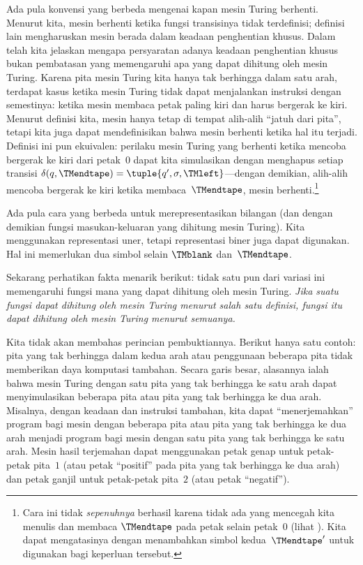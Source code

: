 \documentclass[../../../include/open-logic-section]{subfiles}
\begin{document}
Ada pula konvensi yang berbeda mengenai kapan mesin Turing berhenti. Menurut
kita, mesin berhenti ketika fungsi transisinya tidak terdefinisi; definisi lain
mengharuskan mesin berada dalam keadaan penghentian khusus. Dalam
 telah kita jelaskan mengapa persyaratan adanya keadaan
penghentian khusus bukan pembatasan yang memengaruhi apa yang dapat dihitung
oleh mesin Turing. Karena pita mesin Turing kita hanya tak berhingga dalam
satu arah, terdapat kasus ketika mesin Turing tidak dapat menjalankan
instruksi dengan semestinya: ketika mesin membaca petak paling kiri dan harus
bergerak ke kiri. Menurut definisi kita, mesin hanya tetap di tempat alih-alih
``jatuh dari pita'', tetapi kita juga dapat mendefinisikan bahwa mesin berhenti
ketika hal itu terjadi. Definisi ini pun ekuivalen: perilaku mesin Turing yang
berhenti ketika mencoba bergerak ke kiri dari petak~$0$ dapat kita simulasikan
dengan menghapus setiap transisi $\delta(q,\TMendtape) =
\tuple{q',\sigma,\TMleft}$---dengan demikian, alih-alih mencoba bergerak ke
kiri ketika membaca~$\TMendtape$, mesin berhenti.\footnote{Cara ini tidak
\emph{sepenuhnya} berhasil karena tidak ada yang mencegah kita menulis dan
membaca $\TMendtape$ pada petak selain petak~$0$ (lihat
). Kita dapat mengatasinya dengan menambahkan simbol
kedua~$\TMendtape'$ untuk digunakan bagi keperluan tersebut.}

Ada pula cara yang berbeda untuk merepresentasikan bilangan (dan dengan
demikian fungsi masukan-keluaran yang dihitung mesin Turing). Kita menggunakan
representasi uner, tetapi representasi biner juga dapat digunakan. Hal ini
memerlukan dua simbol selain $\TMblank$ dan~$\TMendtape$.

Sekarang perhatikan fakta menarik berikut: tidak satu pun dari variasi ini
memengaruhi fungsi mana yang dapat dihitung oleh mesin Turing. \emph{Jika suatu
fungsi dapat dihitung oleh mesin Turing menurut salah satu definisi, fungsi itu
dapat dihitung oleh mesin Turing menurut semuanya.}

Kita tidak akan membahas perincian pembuktiannya. Berikut hanya satu contoh:
pita yang tak berhingga dalam kedua arah atau penggunaan beberapa pita tidak
memberikan daya komputasi tambahan. Secara garis besar, alasannya ialah bahwa
mesin Turing dengan satu pita yang tak berhingga ke satu arah dapat
menyimulasikan beberapa pita atau pita yang tak berhingga ke dua arah.
Misalnya, dengan keadaan dan instruksi tambahan, kita dapat ``menerjemahkan''
program bagi mesin dengan beberapa pita atau pita yang tak berhingga ke dua
arah menjadi program bagi mesin dengan satu pita yang tak berhingga ke satu
arah. Mesin hasil terjemahan dapat menggunakan petak genap untuk petak-petak
pita~$1$ (atau petak ``positif'' pada pita yang tak berhingga ke dua arah) dan
petak ganjil untuk petak-petak pita~$2$ (atau petak ``negatif'').
\end{document}
